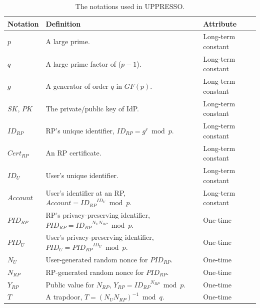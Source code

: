 \begin{table}[tb]
    \caption{The notations used in UPPRESSO.}
    \centering
    \begin{tabular}{|p{1.0cm}|p{4.5cm}|p{2cm}|}
    \hline
    {\textbf{Notation}} & {\textbf{Definition}} & {\textbf{Attribute}} \\
    \hline
    {$p$} & {A large prime.} & {Long-term constant} \\
    \hline
    {$q$} & {A large  prime factor of ($p-1$).} & {Long-term  constant} \\
    \hline
    {$g$} & {A generator of order $q$ in $GF(p)$. } & {Long-term  constant} \\
     \hline
    {$SK$, $PK$} & {The private/public key of IdP. } & {Long-term constant} \\
    \hline
    {$ID_{RP}$} & {RP's unique identifier, $ID_{RP}=g^r \bmod p$.} & {Long-term constant} \\
    \hline
    {$Cert_{RP}$} & {An RP certificate. } & {Long-term constant} \\
    \hline
    {$ID_U$} & {User's unique identifier.} & {Long-term constant} \\
    \hline
    {$Account$} & {User's identifier at an RP, $Account = {ID_{RP}}^{ID_U} \bmod p$.} & {Long-term constant} \\
    \hline
    {$PID_{RP}$} & {RP's privacy-preserving identifier, $PID_{RP} = {ID_{RP}}^{N_{U} N_{RP}} \bmod p$.} & {One-time} \\
    \hline
    {$PID_U$} & {User's privacy-preserving identifier, $PID_U = {PID_{RP}}^{ID_U} \bmod p$.} & {One-time}\\
    \hline
    {$N_U$} & {User-generated random nonce for $PID_{RP}$.} & {One-time} \\
    \hline
    {$N_{RP}$} & {RP-generated random nonce for $PID_{RP}$.} & {One-time} \\
    \hline
    {$Y_{RP}$} & {Public value for $N_{RP}$, $Y_{RP} = {ID_{RP}}^{N_{RP}} \bmod p$.} & {One-time} \\
    \hline
    {$T$} & {A trapdoor, $T=(N_U N_{RP})^{-1} \bmod q$.} & {One-time} \\
    \hline
    \end{tabular}
    \label{tbl:notations}
\end{table}

